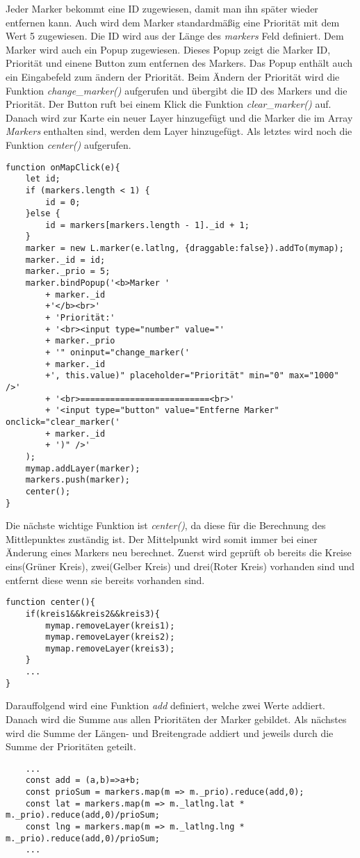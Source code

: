 \documentclass[a4paper, twoside, 12pt]{scrreprt}
\begin{document}
Jeder Marker bekommt eine ID zugewiesen, damit man ihn später wieder entfernen kann.
Auch wird dem Marker standardmäßig eine Priorität mit dem Wert 5 zugewiesen.
Die ID wird aus der Länge des \textit{markers} Feld definiert.
Dem Marker wird auch ein Popup zugewiesen.
Dieses Popup zeigt die Marker ID, Priorität und einene Button zum entfernen des Markers.
Das Popup enthält auch ein Eingabefeld zum ändern der Priorität.
Beim Ändern der Priorität wird die Funktion \textit{change}\_\textit{marker()} aufgerufen und übergibt die ID des Markers und die Priorität.
Der Button ruft bei einem Klick die Funktion \textit{clear}\_\textit{marker()} auf.
Danach wird zur Karte ein neuer Layer hinzugefügt und die Marker die im Array \textit{Markers} enthalten sind, werden dem Layer hinzugefügt.
Als letztes wird noch die Funktion \textit{center()} aufgerufen.
\begin{lstlisting}
function onMapClick(e){
	let id;
	if (markers.length < 1) {
		id = 0;
	}else {
		id = markers[markers.length - 1]._id + 1;
	}
	marker = new L.marker(e.latlng, {draggable:false}).addTo(mymap);
	marker._id = id;
	marker._prio = 5;
	marker.bindPopup('<b>Marker '
		+ marker._id
		+'</b><br>'
    	+ 'Priorität:'
		+ '<br><input type="number" value="'
		+ marker._prio
		+ '" oninput="change_marker('
		+ marker._id
		+', this.value)" placeholder="Priorität" min="0" max="1000" />'
		+ '<br>==========================<br>'
		+ '<input type="button" value="Entferne Marker" onclick="clear_marker('
		+ marker._id
		+ ')" />'
	);
	mymap.addLayer(marker);
	markers.push(marker);
	center();
}
\end{lstlisting}
Die nächste wichtige Funktion ist \textit{center()}, da diese für die Berechnung des Mittlepunktes zuständig ist. Der Mittelpunkt wird somit immer bei einer Änderung eines Markers neu berechnet.
Zuerst wird geprüft ob bereits die Kreise eins(Gr\"uner Kreis), zwei(Gelber Kreis) und drei(Roter Kreis) vorhanden sind und entfernt diese wenn sie bereits vorhanden sind.
\begin{lstlisting}
function center(){
	if(kreis1&&kreis2&&kreis3){
		mymap.removeLayer(kreis1);
		mymap.removeLayer(kreis2);
		mymap.removeLayer(kreis3);
	}
	...
}
\end{lstlisting}
Darauffolgend wird eine Funktion \textit{add} definiert, welche zwei Werte addiert. Danach wird die Summe aus allen Prioritäten der Marker gebildet. Als nächstes wird die Summe der Längen- und Breitengrade addiert und jeweils durch die Summe der Prioritäten geteilt.
\begin{lstlisting}
	...
	const add = (a,b)=>a+b;
	const prioSum = markers.map(m => m._prio).reduce(add,0);
	const lat = markers.map(m => m._latlng.lat * m._prio).reduce(add,0)/prioSum;
	const lng = markers.map(m => m._latlng.lng * m._prio).reduce(add,0)/prioSum;
	...
\end{lstlisting}
\end{document}
